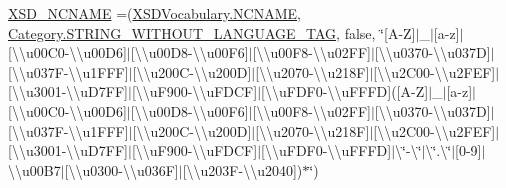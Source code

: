 \begin{DoxyCompactItemize}
\item 
\hyperlink{enumorg_1_1semanticweb_1_1owlapi_1_1vocab_1_1_o_w_l2_datatype_ae1246910d1f122474d1426cd2fb50712}{X\-S\-D\-\_\-\-N\-C\-N\-A\-M\-E} =(\hyperlink{enumorg_1_1semanticweb_1_1owlapi_1_1vocab_1_1_x_s_d_vocabulary_a809c4d39248eaee8d204aa51e4c04f45}{X\-S\-D\-Vocabulary.\-N\-C\-N\-A\-M\-E}, \hyperlink{enumorg_1_1semanticweb_1_1owlapi_1_1vocab_1_1_o_w_l2_datatype_1_1_category_a44f9e4681f05aa129189fc174186298a}{Category.\-S\-T\-R\-I\-N\-G\-\_\-\-W\-I\-T\-H\-O\-U\-T\-\_\-\-L\-A\-N\-G\-U\-A\-G\-E\-\_\-\-T\-A\-G}, false, \char`\"{}\mbox{[}A-\/Z\mbox{]}$|$\-\_\-$|$\mbox{[}a-\/z\mbox{]}$|$\mbox{[}\textbackslash{}\textbackslash{}u00\-C0-\/\textbackslash{}\textbackslash{}u00\-D6\mbox{]}$|$\mbox{[}\textbackslash{}\textbackslash{}u00\-D8-\/\textbackslash{}\textbackslash{}u00\-F6\mbox{]}$|$\mbox{[}\textbackslash{}\textbackslash{}u00\-F8-\/\textbackslash{}\textbackslash{}u02\-F\-F\mbox{]}$|$\mbox{[}\textbackslash{}\textbackslash{}u0370-\/\textbackslash{}\textbackslash{}u037\-D\mbox{]}$|$\mbox{[}\textbackslash{}\textbackslash{}u037\-F-\/\textbackslash{}\textbackslash{}u1\-F\-F\-F\mbox{]}$|$\mbox{[}\textbackslash{}\textbackslash{}u200\-C-\/\textbackslash{}\textbackslash{}u200\-D\mbox{]}$|$\mbox{[}\textbackslash{}\textbackslash{}u2070-\/\textbackslash{}\textbackslash{}u218\-F\mbox{]}$|$\mbox{[}\textbackslash{}\textbackslash{}u2\-C00-\/\textbackslash{}\textbackslash{}u2\-F\-E\-F\mbox{]}$|$\mbox{[}\textbackslash{}\textbackslash{}u3001-\/\textbackslash{}\textbackslash{}u\-D7\-F\-F\mbox{]}$|$\mbox{[}\textbackslash{}\textbackslash{}u\-F900-\/\textbackslash{}\textbackslash{}u\-F\-D\-C\-F\mbox{]}$|$\mbox{[}\textbackslash{}\textbackslash{}u\-F\-D\-F0-\/\textbackslash{}\textbackslash{}u\-F\-F\-F\-D\mbox{]}(\mbox{[}A-\/Z\mbox{]}$|$\-\_\-$|$\mbox{[}a-\/z\mbox{]}$|$\mbox{[}\textbackslash{}\textbackslash{}u00\-C0-\/\textbackslash{}\textbackslash{}u00\-D6\mbox{]}$|$\mbox{[}\textbackslash{}\textbackslash{}u00\-D8-\/\textbackslash{}\textbackslash{}u00\-F6\mbox{]}$|$\mbox{[}\textbackslash{}\textbackslash{}u00\-F8-\/\textbackslash{}\textbackslash{}u02\-F\-F\mbox{]}$|$\mbox{[}\textbackslash{}\textbackslash{}u0370-\/\textbackslash{}\textbackslash{}u037\-D\mbox{]}$|$\mbox{[}\textbackslash{}\textbackslash{}u037\-F-\/\textbackslash{}\textbackslash{}u1\-F\-F\-F\mbox{]}$|$\mbox{[}\textbackslash{}\textbackslash{}u200\-C-\/\textbackslash{}\textbackslash{}u200\-D\mbox{]}$|$\mbox{[}\textbackslash{}\textbackslash{}u2070-\/\textbackslash{}\textbackslash{}u218\-F\mbox{]}$|$\mbox{[}\textbackslash{}\textbackslash{}u2\-C00-\/\textbackslash{}\textbackslash{}u2\-F\-E\-F\mbox{]}$|$\mbox{[}\textbackslash{}\textbackslash{}u3001-\/\textbackslash{}\textbackslash{}u\-D7\-F\-F\mbox{]}$|$\mbox{[}\textbackslash{}\textbackslash{}u\-F900-\/\textbackslash{}\textbackslash{}u\-F\-D\-C\-F\mbox{]}$|$\mbox{[}\textbackslash{}\textbackslash{}u\-F\-D\-F0-\/\textbackslash{}\textbackslash{}u\-F\-F\-F\-D\mbox{]}$|$\textbackslash{}\char`\"{}-\/\textbackslash{}\char`\"{}$|$\textbackslash{}\char`\"{}.\textbackslash{}\char`\"{}$|$\mbox{[}0-\/9\mbox{]}$|$\textbackslash{}\textbackslash{}u00\-B7$|$\mbox{[}\textbackslash{}\textbackslash{}u0300-\/\textbackslash{}\textbackslash{}u036\-F\mbox{]}$|$\mbox{[}\textbackslash{}\textbackslash{}u203\-F-\/\textbackslash{}\textbackslash{}u2040\mbox{]})$\ast$\char`\"{})

\end{DoxyCompactItemize}
